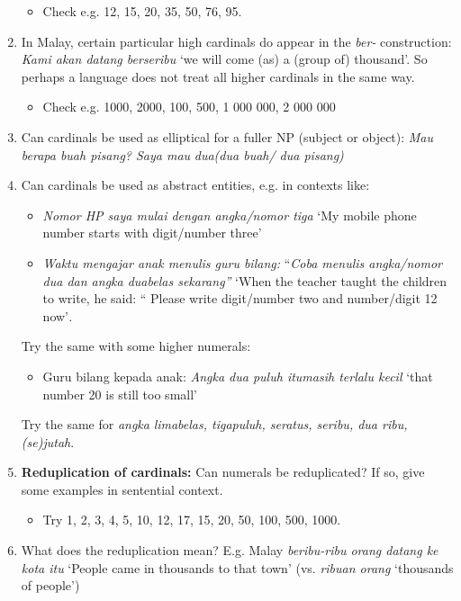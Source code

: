 \begin{enumerate}
\begin{itemize}
\item Check e.g. 12, 15, 20, 35, 50, 76, 95. 
\end{itemize}
\item In Malay, certain particular high cardinals do appear in the \textit{ber-} construction: \textit{Kami akan datang berseribu} `we will come (as) a (group of) thousand'. So perhaps a language does not treat all higher cardinals in the same way. 
\begin{itemize}
\item Check e.g. 1000, 2000, 100, 500, 1 000 000, 2 000 000
\end{itemize}
\item Can cardinals be used as elliptical for a fuller NP (subject or object): \textit{Mau berapa buah pisang? Saya mau} \textit{dua}\textit{(dua buah/ dua pisang)}
\item Can cardinals be used as abstract entities, e.g. in contexts like: 
\begin{itemize}
\item \textit{Nomor HP saya mulai dengan angka/nomor tiga} `My mobile phone number starts with digit/number three' 
\item \textit{Waktu mengajar anak menulis guru bilang:} ``\textit{Coba menulis angka/nomor dua dan angka duabelas sekarang''}  `When the teacher taught the children to write, he said: `` Please write digit/number two and number/digit 12 now'\textit{.} 
\end{itemize}
Try the same with some higher numerals: 
\begin{itemize}
\item Guru bilang kepada anak: \textit{Angka dua puluh itu}\textit{masih terlalu kecil } `that number 20 is still too small' 
\end{itemize}
Try the same for \textit{angka} \textit{limabelas, tigapuluh, seratus, seribu, dua ribu, (se)jutah}.
\item  \textbf{Reduplication of cardinals:} Can numerals be reduplicated? If so, give some examples in sentential context. 
\begin{itemize}
\item Try 1, 2, 3, 4, 5, 10, 12, 17, 15, 20, 50, 100, 500, 1000.
\end{itemize}
\item What does the reduplication mean? E.g. Malay \textit{beribu-ribu orang datang ke kota itu} `People came in thousands to that town' (vs. \textit{ribuan orang} `thousands of people') 

\end{enumerate}
